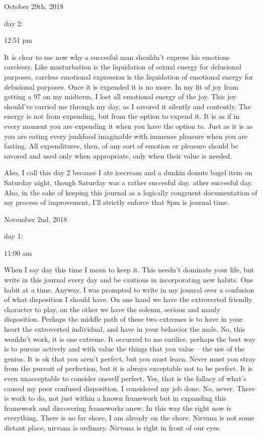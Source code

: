 \bigskip
\bigskip
October 29th, 2018

day 2:

12:51 pm

It is clear to me now why a succesful man shouldn't express his emotions
carelessy. Like masturbation is the liquidation of sexual energy for
delusional purposes, careless emotional expression is the liquidation of
emotional energy for delusional purposes. Once it is expended it is no
more. In my fit of joy from getting a 97 on my midterm, I lost all
emotional energy of the joy. This joy should've carried me through my
day, as I savored it silently and contently. The energy is not from
expending, but from the option to expend it. It is as if in every moment
you are expending it when you have the option to. Just as it is as you
are eating every junkfood imaginable with immense pleasure when you are
fasting. All expenditures, then, of any sort of emotion or pleasure
should be savored and used only when appropriate, only when their value
is needed.

Also, I call this day 2 because I ate icecream and a dunkin donuts bagel
item on Saturday night, though Saturday was a rather succesful day.
ather succesful day. Also, in the sake of keeping this journal as a
logically congruent documentation of my process of improvement, I'll
strictly enforce that 8pm is journal time.

\bigskip
\bigskip
November 2nd, 2018

day 1:

11:00 am

When I say day this time I mean to keep it. This needn't dominate your
life, but write in this journal every day and be cautious in
incorporating new habits. One habit at a time. Anyway, I was prompted to
write in my jounral over a confusion of what disposition I should have.
On one hand we have the extroverted friendly character to play, on the
other we have the solemn, serious and manly disposition. Perhaps the
middle path of these two extremes is to have in your heart the
extroverted individual, and have in your behavior the male. No, this
wouldn't work, it is one extreme. It occurred to me earilier, perhaps
the best way is to pursue actively and with value the things that you
value -- the use of the genius. It is ok that you aren't perfect, but
you must learn. Never must you stray from the pursuit of perfection, but
it is always exceptable not to be perfect. It is even unacceptable to
consider oneself perfect. Yes, that is the fallacy of what's caused my
poor confused disposition. I considered my job done. No, never. There is
work to do, not just within a known framework but in expanding this
framework and discovering frameworks anew. In this way the right now is
everything. There is no far shore, I am already on the shore. Nirvana is
not some distant place, nirvana is ordinary. Nirvana is right in front
of our eyes.

